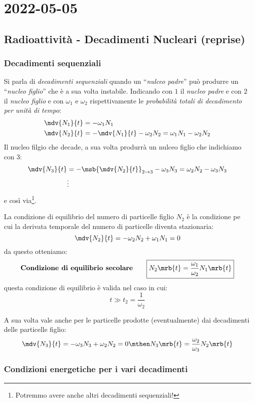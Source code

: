 \chapter{2022-05-05}
\section{Radioattività - Decadimenti Nucleari (reprise)}
\subsection{Decadimenti sequenziali}
Si parla di \textit{decadimenti sequenziali} quando un ``\textit{nulceo
padre}'' può produrre un ``\textit{nucleo figlio}'' che è a sua volta
instabile. Indicando con $1$ il \textit{nucleo padre} e con $2$ il
\textit{nucleo figlio} e con $\omega_1$ e $\omega_2$ rispettivamente le
\textit{probabilità totali di decadimento per unità di tempo}:
\begin{align*}
  \mdv{N_1}{t} &= - \omega_1 N_1
  \\
  \mdv{N_2}{t} &= - \mdv{N_1}{t} - \omega_2 N_2 = \omega_1 N_1 - \omega_2 N_2
\end{align*}
Il nucleo filgio che decade, a sua volta produrrà un nulceo figlio che
indichiamo con $3$:
\begin{align*}
  \mdv{N_3}{t} &= - \msb{\mdv{N_2}{t}}_{2\to3} - \omega_3 N_3 = \omega_2 N_2 -
  \omega_3 N_3
  \\
  &\vdots 
\end{align*}
e così via\footnote{
  Potremmo avere anche altri decadimenti sequenziali!
}.

La condizione di equilibrio del numero di particelle figlio $N_2$ è la
condizione pe cui la derivata temporale del numero di particelle diventa
stazionaria:
\[
  \mdv{N_2}{t} = -\omega_2 N_2 + \omega_1 N_1 = 0
\]
da questo otteniamo:
\[
  \textbf{Condizione di equilibrio secolare}\qquad
  \boxed{
    N_2 \mrb{t} = \frac{\omega_1}{\omega_2} N_1 \mrb{t}
  }
\]
questa condizione di equilibrio è valida nel caso in cui:
\[
  t \gg t_2 = \frac{1}{\omega_2}
\]

A sua volta vale anche per le particelle prodotte (eventualmente) dai
decadimenti delle particelle figlio:
\[
  \mdv{N_3}{t} = -\omega_3 N_3 + \omega_2 N_2 = 0
  \mthen
  N_3 \mrb{t} = \frac{\omega_2}{\omega_3} N_2 \mrb{t}
\]

\subsection{Condizioni energetiche per i vari decadimenti}
